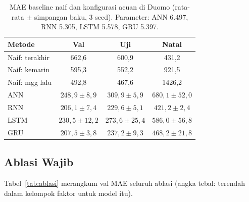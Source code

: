 \documentclass[conference,a4paper]{IEEEtran}
\begin{document}
\begin{table}[t]
  \centering
  \caption{MAE baseline naif dan konfigurasi acuan di Duomo (rata-rata $\pm$ simpangan baku, 3 seed). Parameter: ANN 6.497, RNN 5.305, LSTM 5.578, GRU 5.397.}
  \label{tab:acuanhasil}
  \scriptsize
  \setlength{\tabcolsep}{3pt}
  \begin{tabular}{@{}lccc@{}}
    \toprule
    Metode & Val & Uji & Natal \\
    \midrule
    Naif: terakhir  & 662,6 & 600,9 & 431,2 \\
    Naif: kemarin   & 595,3 & 552,2 & 921,5 \\
    Naif: mgg lalu  & 492,8 & 467,6 & 1426,2 \\
    \midrule
    ANN  & $248{,}9 \pm 8{,}9$ & $309{,}9 \pm 5{,}9$ & $680{,}1 \pm 52{,}0$ \\
    RNN  & $206{,}1 \pm 7{,}4$ & $229{,}6 \pm 5{,}1$ & $421{,}2 \pm 2{,}4$ \\
    LSTM & $230{,}5 \pm 12{,}2$ & $273{,}6 \pm 25{,}4$ & $586{,}0 \pm 56{,}8$ \\
    GRU  & $207{,}5 \pm 3{,}8$ & $237{,}2 \pm 9{,}3$ & $468{,}2 \pm 21{,}8$ \\
    \bottomrule
  \end{tabular}
\end{table}

\subsection{Ablasi Wajib}
Tabel~\ref{tab:ablasi} merangkum val MAE seluruh ablasi (angka tebal: terendah dalam kelompok faktor untuk model itu).
\end{document}
